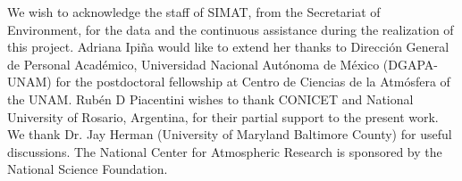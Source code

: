 \documentclass[journal=jacsat,manuscript=article]{achemso}
\begin{document}
\begin{acknowledgement}
  We wish to acknowledge the staff of SIMAT, from the Secretariat of
  Environment, for the data and the continuous assistance during the
  realization of this project. Adriana Ipiña would like to extend her
  thanks to Dirección General de Personal Académico, Universidad
  Nacional Autónoma de México (DGAPA-UNAM) for the postdoctoral fellowship
  at Centro de Ciencias de la Atmósfera of the UNAM. Rubén D Piacentini
  wishes to thank CONICET and National University of Rosario, Argentina,
  for their partial support to the present work. We thank Dr. Jay Herman
  (University of Maryland Baltimore County) for useful discussions. The National Center for
  Atmospheric Research is sponsored by the National Science Foundation.
\end{acknowledgement}










\end{document}
